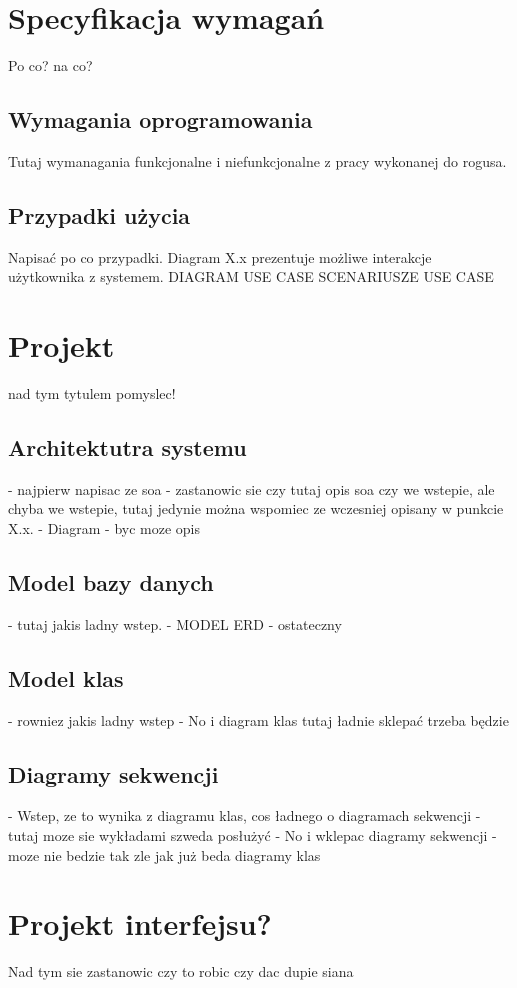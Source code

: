 \section{Specyfikacja wymagań}
Po co? na co?
\subsection{Wymagania oprogramowania}
Tutaj wymanagania funkcjonalne i niefunkcjonalne z pracy wykonanej do rogusa.
\subsection{Przypadki użycia}
Napisać po co przypadki. Diagram X.x prezentuje możliwe interakcje użytkownika z systemem.\newline
DIAGRAM USE CASE\newline
SCENARIUSZE USE CASE \newline

\section{Projekt}
nad tym tytulem pomyslec!\newline
\subsection{Architektutra systemu}
- najpierw napisac ze soa\newline
- zastanowic sie czy tutaj opis soa czy we wstepie, ale chyba we wstepie, tutaj jedynie można wspomiec ze wczesniej opisany w punkcie X.x.\newline
- Diagram \newline
- byc moze opis

\subsection{Model bazy danych}
- tutaj jakis ladny wstep.\newline
- MODEL ERD - ostateczny \newline

\subsection{Model klas}
- rowniez jakis ladny wstep \newline
- No i diagram klas tutaj ładnie sklepać trzeba będzie \newline

\subsection{Diagramy sekwencji}
- Wstep, ze to wynika z diagramu klas, cos ładnego o diagramach sekwencji - tutaj moze sie wykładami szweda posłużyć \newline
- No i wklepac diagramy sekwencji - moze nie bedzie tak zle jak już beda diagramy klas \newline
\section {Projekt interfejsu?}
Nad tym sie zastanowic czy to robic czy dac dupie siana

